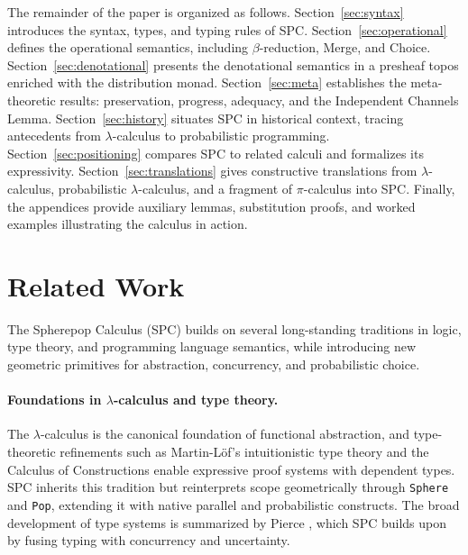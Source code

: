 \documentclass{article}
\begin{document}
The remainder of the paper is organized as follows. 
Section~\ref{sec:syntax} introduces the syntax, types, and typing rules of SPC. 
Section~\ref{sec:operational} defines the operational semantics, including 
$\beta$-reduction, Merge, and Choice. 
Section~\ref{sec:denotational} presents the denotational semantics in a presheaf 
topos enriched with the distribution monad. 
Section~\ref{sec:meta} establishes the meta-theoretic results: preservation, 
progress, adequacy, and the Independent Channels Lemma. 
Section~\ref{sec:history} situates SPC in historical context, tracing antecedents 
from $\lambda$-calculus to probabilistic programming. 
Section~\ref{sec:positioning} compares SPC to related calculi and formalizes its 
expressivity. 
Section~\ref{sec:translations} gives constructive translations from $\lambda$-calculus, 
probabilistic $\lambda$-calculus, and a fragment of $\pi$-calculus into SPC. 
Finally, the appendices provide auxiliary lemmas, substitution proofs, and worked 
examples illustrating the calculus in action.

\section{Related Work}

The Spherepop Calculus (SPC) builds on several long-standing traditions in logic,
type theory, and programming language semantics, while introducing new
geometric primitives for abstraction, concurrency, and probabilistic choice.

\paragraph{Foundations in $\lambda$-calculus and type theory.}
The $\lambda$-calculus \cite{church1940formulation,barendregt1984lambda} is the
canonical foundation of functional abstraction, and type-theoretic refinements
such as Martin-Löf’s intuitionistic type theory \cite{martinlof1975intuitionistic}
and the Calculus of Constructions \cite{coquand1988calculus} enable expressive
proof systems with dependent types. SPC inherits this tradition but reinterprets
scope geometrically through \texttt{Sphere} and \texttt{Pop}, extending it with
native parallel and probabilistic constructs. The broad development of type
systems is summarized by Pierce \cite{pierce2002types}, which SPC builds upon by
fusing typing with concurrency and uncertainty.
\end{document}
